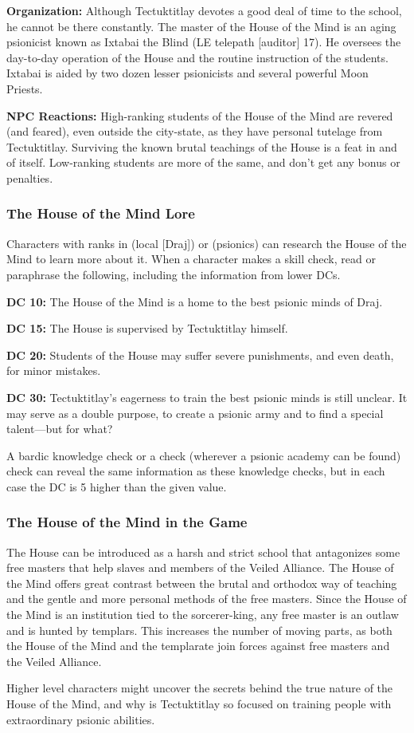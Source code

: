 \textbf{Organization:} Although Tectuktitlay devotes a good deal of time to the school, he cannot be there constantly. The master of the House of the Mind is an aging psionicist known as Ixtabai the Blind (LE telepath [auditor] 17). He oversees the day-to-day operation of the House and the routine instruction of the students. Ixtabai is aided by two dozen lesser psionicists and several powerful Moon Priests.

\textbf{NPC Reactions:} High-ranking students of the House of the Mind are revered (and feared), even outside the city-state, as they have personal tutelage from Tectuktitlay. Surviving the known brutal teachings of the House is a feat in and of itself. Low-ranking students are more of the same, and don't get any bonus or penalties.

\subsubsection{The House of the Mind Lore}
Characters with ranks in  (local [Draj]) or  (psionics) can research the House of the Mind to learn more about it. When a character makes a skill check, read or paraphrase the following, including the information from lower DCs.

\textbf{DC 10:} The House of the Mind is a home to the best psionic minds of Draj.

\textbf{DC 15:} The House is supervised by Tectuktitlay himself.

\textbf{DC 20:} Students of the House may suffer severe punishments, and even death, for minor mistakes.

\textbf{DC 30:} Tectuktitlay's eagerness to train the best psionic minds is still unclear. It may serve as a double purpose, to create a psionic army and to find a special talent---but for what?

A bardic knowledge check or a  check (wherever a psionic academy can be found) check can reveal the same information as these knowledge checks, but in each case the DC is 5 higher than the given value.

\subsubsection{The House of the Mind in the Game}
The House can be introduced as a harsh and strict school that antagonizes some free masters that help slaves and members of the Veiled Alliance. The House of the Mind offers great contrast between the brutal and orthodox way of teaching and the gentle and more personal methods of the free masters. Since the House of the Mind is an institution tied to the sorcerer-king, any free master is an outlaw and is hunted by templars. This increases the number of moving parts, as both the House of the Mind and the templarate join forces against free masters and the Veiled Alliance.

Higher level characters might uncover the secrets behind the true nature of the House of the Mind, and why is Tectuktitlay so focused on training people with extraordinary psionic abilities.

